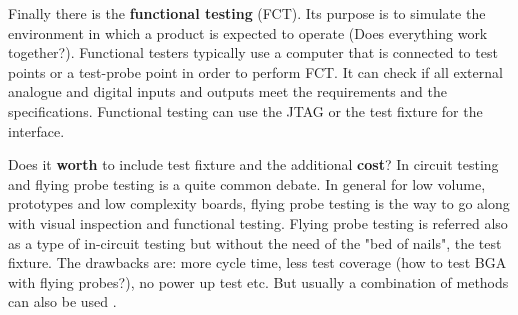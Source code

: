 \documentclass[final]{cubedoc}
\begin{document}
	Finally there is the \textbf{functional testing} (FCT). Its purpose is to simulate the environment in which a product is expected to operate (Does everything work together?). Functional testers typically use a computer that is connected to test points or a test-probe point in order to perform FCT.
	It can check if all external analogue and digital inputs and outputs meet the requirements and the specifications. Functional testing can use the JTAG or the test fixture for the interface. 
	
	
	
	Does it \textbf{worth} to include test fixture and the additional \textbf{cost}? In circuit testing and flying probe testing is a quite common debate. In general for low volume, prototypes and low complexity boards, flying probe testing is the way to go along with visual inspection and functional testing. Flying probe testing is referred also as a type of in-circuit testing but without the need of the "bed of nails", the test fixture. The drawbacks are: more cycle time, less test coverage (how to test BGA with flying probes?), no power up test etc. But usually a combination of methods can also be used \cite{matric:flying}. 
	
	
	
	
	
	
	
\end{document}
